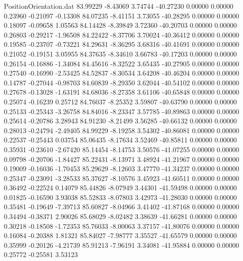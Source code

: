 \begin{filecontents}{PositionOrientation.dat}
  83.99229   -8.43069    3.74744   -40.27230    0.00000    0.00000    0.23960   -0.21097   -0.13308
  84.07235   -8.41151    3.73055   -40.28295    0.00000    0.00000    0.18097   -0.09658    1.05563
  84.14428   -8.39849    3.72360   -40.20703    0.00000    0.00000    0.26803   -0.29217   -1.96508
  84.22422   -8.37706    3.70024   -40.36412    0.00000    0.00000    0.19585   -0.23707   -0.73221
  84.29631   -8.36295    3.68316   -40.41691    0.00000    0.00000    0.21052   -0.19151    3.05955
  84.37635   -8.34610    3.66783   -40.17203    0.00000    0.00000    0.26154   -0.16886   -1.34084
  84.45616   -8.32522    3.65435   -40.27905    0.00000    0.00000    0.27540   -0.16990   -2.53425
  84.52837   -8.30534    3.64208   -40.46204    0.00000    0.00000    0.14787   -0.27044   -0.98703
  84.60839   -8.29350    3.62044   -40.54102    0.00000    0.00000    0.27678   -0.13028   -1.63191
  84.68036   -8.27358    3.61106   -40.65848    0.00000    0.00000    0.25074   -0.16239    0.25712
  84.76037   -8.25352    3.59807   -40.63790    0.00000    0.00000    0.25133   -0.25343   -3.26758
  84.84016   -8.23347    3.57785   -40.89863    0.00000    0.00000    0.25614   -0.20786    3.28943
  84.91230   -8.21499    3.56285   -40.66132    0.00000    0.00000    0.28013   -0.24794   -2.49405
  84.99229   -8.19258    3.54302   -40.86081    0.00000    0.00000    0.22537   -0.25443    0.03754
  85.06435   -8.17634    3.52469   -40.85811    0.00000    0.00000    0.35931   -0.23610   -2.67420
  85.14454   -8.14753    3.50576   -41.07255    0.00000    0.00000    0.09798   -0.20706   -1.84427
  85.22431   -8.13971    3.48924   -41.21967    0.00000    0.00000    0.19009   -0.16036   -1.70453
  85.29629   -8.12603    3.47770   -41.34237    0.00000    0.00000    0.25347   -0.23091   -3.28533
  85.37627   -8.10576    3.45923   -41.60511    0.00000    0.00000    0.36492   -0.22524    0.14079
  85.44826   -8.07949    3.44301   -41.59498    0.00000    0.00000    0.01825   -0.16590    3.93038
  85.52833   -8.07803    3.42973   -41.28030    0.00000    0.00000    0.35481   -0.19649   -7.39713
  85.60827   -8.04966    3.41402   -41.87168    0.00000    0.00000    0.34494   -0.38371    2.90026
  85.68029   -8.02482    3.38639   -41.66281    0.00000    0.00000    0.30218   -0.18508   -1.72353
  85.76033   -8.00063    3.37157   -41.80076    0.00000    0.00000    0.16084   -0.20388    1.81321
  85.84027   -7.98777    3.35527   -41.65579    0.00000    0.00000    0.35999   -0.20126   -4.21739
  85.91213   -7.96191    3.34081   -41.95884    0.00000    0.00000    0.25772   -0.25581    3.53123

\end{filecontents}
